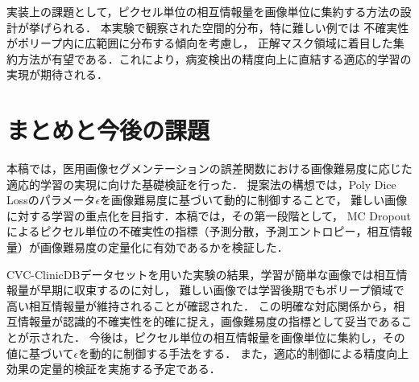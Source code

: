 \documentclass[10pt, a4paper, twocolumn]{jarticle}
\begin{document}
実装上の課題として，ピクセル単位の相互情報量を画像単位に集約する方法の設計が挙げられる．
本実験で観察された空間的分布，特に難しい例では
不確実性がポリープ内に広範囲に分布する傾向を考慮し，
正解マスク領域に着目した集約方法が有望である．これにより，病変検出の精度向上に直結する適応的学習の実現が期待される．

\section{まとめと今後の課題}
本稿では，医用画像セグメンテーションの誤差関数における画像難易度に応じた適応的学習の実現に向けた基礎検証を行った．
提案法の構想では，Poly Dice Lossのパラメータ$\epsilon$を画像難易度に基づいて動的に制御することで，
難しい画像に対する学習の重点化を目指す．本稿では，その第一段階として，
MC Dropoutによるピクセル単位の不確実性の指標（予測分散，予測エントロピー，相互情報量）が画像難易度の定量化に有効であるかを検証した．

CVC-ClinicDBデータセットを用いた実験の結果，学習が簡単な画像では相互情報量が早期に収束するのに対し，
難しい画像では学習後期でもポリープ領域で高い相互情報量が維持されることが確認された．
この明確な対応関係から，相互情報量が認識的不確実性を的確に捉え，画像難易度の指標として妥当であることが示された．
今後は，ピクセル単位の相互情報量を画像単位に集約し，その値に基づいて$\epsilon$を動的に制御する手法をする．
また，適応的制御による精度向上効果の定量的検証を実施する予定である．

\newpage
\end{document}

